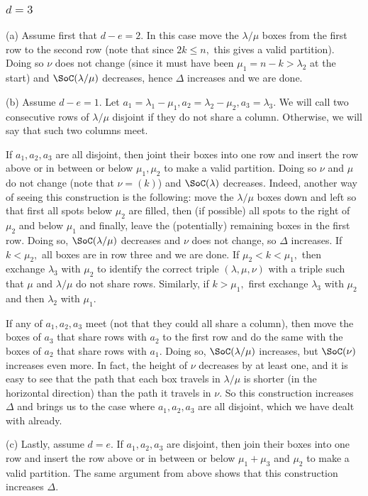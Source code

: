 \documentclass[12pt,dvipsnames,accepted=2016-08-18,a4paper,onecolumn]{quantumarticle}
\def\la{\lambda}
\def\la{\lambda}
\numberwithin{equation}{section}
\theoremstyle{definition}
\begin{document}
\subsubsection{$d=3$}

(a) Assume first that $d-e=2.$ In this case move the $\la/\mu$ boxes from the first row to the second row (note that since $2k\leq n,$ this gives a valid partition). Doing so $\nu$ does not change (since it must have been $\mu_1 = n-k >\la_2$ at the start)  and  $\SoC(\la/\mu)$ decreases, hence $\Delta$ increases and we are done.

(b) Assume $d-e=1.$ Let $a_1=\la_1-\mu_1, a_2 = \la_2-\mu_2,a_3 = \la_3.$ We will call two consecutive rows of $\la/\mu$ disjoint if they do not share a column. Otherwise, we will say that such two columns meet. 

If $a_1,a_2,a_3$ are all disjoint, then joint their boxes into one row and insert the row above or in between or below $\mu_1,\mu_2$ to make a valid partition. Doing so $\nu$ and $\mu$ do not change (note that $\nu=(k)$) and $\SoC(\la)$ decreases. Indeed, another way of seeing this construction is the following: move the $\la/\mu$ boxes down and left so that first all spots below $\mu_2$ are filled, then (if possible) all spots to the right of $\mu_2$ and below $\mu_1$ and finally, leave the (potentially) remaining boxes in the first row. Doing so, $\SoC(\la/\mu)$ decreases and $\nu$ does not change, so $\Delta$ increases. If $k<\mu_2,$ all boxes are in row three and we are done. If $\mu_2 <k<\mu_1,$ then exchange $\la_3$ with $\mu_2$ to identify the correct triple $(\la,\mu,\nu)$ with a triple such that $\mu$ and $\la/\mu$ do not share rows.
Similarly, if $k>\mu_1,$ first exchange $\la_3$ with $\mu_2$ and then $\la_2$ with $\mu_1.$


If any of  $a_1,a_2,a_3$ meet (not that they could all share a column), then move the boxes of $a_3$ that share rows with $a_2$ to the first row and do the same with the boxes of $a_2$ that share rows with $a_1.$ Doing so, $\SoC(\la/\mu)$ increases, but $\SoC(\nu)$ increases even more. In fact, the height of $\nu$ decreases by at least one, and it is easy to see that the path that each box travels in $\la/\mu$ is shorter (in the horizontal direction) than the path it travels in $\nu.$
So this construction increases $\Delta$ and brings us to the case where $a_1,a_2,a_3$ are all disjoint, which we have dealt with already.


(c) Lastly, assume $d=e.$ If $a_1,a_2,a_3$ are disjoint, then join their boxes into one row and insert the row above or in between or below $\mu_1+\mu_3$ and $\mu_2$ to make a valid partition. The same argument from above shows that this construction increases $\Delta.$ 
\end{document}
